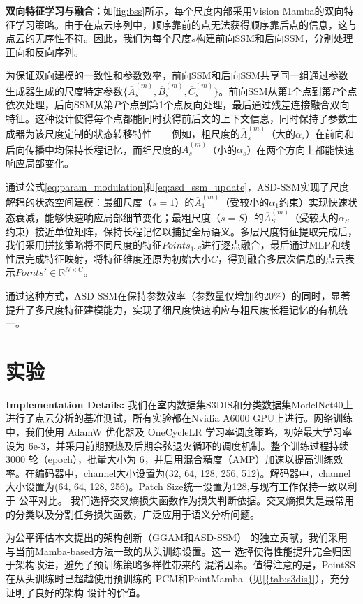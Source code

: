 \documentclass[preprint,12pt]{elsarticle}
\begin{document}
\textbf{双向特征学习与融合：}如\cref{fig:bss}所示，每个尺度内部采用Vision Mamba\cite{VisionMamba}的双向特征学习策略。由于在点云序列中，顺序靠前的点无法获得顺序靠后点的信息，这与点云的无序性不符。因此，我们为每个尺度$s$构建前向SSM和后向SSM，分别处理正向和反向序列。

为保证双向建模的一致性和参数效率，前向SSM和后向SSM共享同一组通过参数生成器生成的尺度特定参数$\{\overline{A}_s^{(m)}, \overline{B}_s^{(m)}, \overline{C}_s^{(m)}\}$。前向SSM从第1个点到第$P$个点依次处理，后向SSM从第$P$个点到第1个点反向处理，最后通过残差连接融合双向特征。这种设计使得每个点都能同时获得前后文的上下文信息，同时保持了参数生成器为该尺度定制的状态转移特性——例如，粗尺度的$\overline{A}_s^{(m)}$（大的$\alpha_s$）在前向和后向传播中均保持长程记忆，而细尺度的$\overline{A}_s^{(m)}$（小的$\alpha_s$）在两个方向上都能快速响应局部变化。

通过公式\ref{eq:param_modulation}和\ref{eq:asd_ssm_update}，ASD-SSM实现了尺度解耦的状态空间建模：最细尺度（$s=1$）的$\overline{A}_1^{(m)}$（受较小的$\alpha_1$约束）实现快速状态衰减，能够快速响应局部细节变化；最粗尺度（$s=S$）的$\overline{A}_S^{(m)}$（受较大的$\alpha_S$约束）接近单位矩阵，保持长程记忆以捕捉全局语义。多层尺度特征提取完成后，我们采用拼接策略将不同尺度的特征$Points_{1:S}$进行逐点融合，最后通过MLP和线性层完成特征映射，将特征维度还原为初始大小$C$，得到融合多层次信息的点云表示$Points'\in\mathbb{R}^{N\times C}$。

通过这种方式，ASD-SSM在保持参数效率（参数量仅增加约20\%）的同时，显著提升了多尺度特征建模能力，实现了细尺度快速响应与粗尺度长程记忆的有机统一。

\section{实验}
\textbf{Implementation Details:}
我们在室内数据集S3DIS和分类数据集ModelNet40上进行了点云分析的基准测试，所有实验都在Nvidia A6000 GPU上进行。网络训练中，我们使用 AdamW 优化器及 OneCycleLR 学习率调度策略，初始最大学习率设为 6e-3，并采用前期预热及后期余弦退火循环的调度机制。整个训练过程持续 3000 轮（epoch），批量大小为 6，并启用混合精度（AMP）加速以提高训练效率。在编码器中，channel大小设置为(32, 64, 128, 256, 512)。解码器中，channel大小设置为(64, 64, 128, 256)。Patch Size统一设置为128,与现有工作保持一致以利于
公平对比。
我们选择交叉熵损失函数作为损失判断依据。交叉熵损失是最常用的分类以及分割任务损失函数，广泛应用于语义分析问题。

为公平评估本文提出的架构创新（GGAM和ASD-SSM）
的独立贡献，我们采用与当前Mamba-based方法一致的从头训练设置。这一
选择使得性能提升完全归因于架构改进，避免了预训练策略多样性带来的
混淆因素。值得注意的是，PointSS在从头训练时已超越使用预训练的
PCM和PointMamba（见\cref{{tab:s3dis}}），充分证明了良好的架构
设计的价值。
\end{document}

